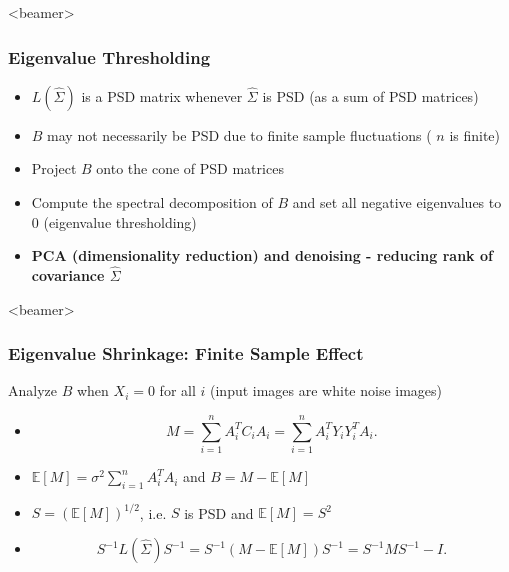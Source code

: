 \documentclass{beamer}
\begin{document}
\begin{frame}<beamer>
\frametitle{Eigenvalue Thresholding}
\begin{itemize}
 \item  $L(\hat{\Sigma})$ is a PSD matrix whenever $\hat{\Sigma}$ is PSD (as 
a sum of PSD matrices)
\item  $B$ may not necessarily be PSD due to finite 
sample fluctuations ( $n$ is finite)
\item  Project 
$B$ onto the cone of PSD matrices
\item  Compute the spectral 
decomposition of $B$ and set all negative eigenvalues to 0  (eigenvalue thresholding)
\item \textbf{PCA (dimensionality reduction) and denoising - reducing rank of covariance $\hat{\Sigma}$}
\end{itemize}
\end{frame}

\begin{frame}<beamer>
\frametitle{Eigenvalue Shrinkage: Finite Sample Effect}
Analyze $B$ when $X_i=0$ for all $i$ (input images 
are white noise images)


\begin{itemize}
 \item  \begin{equation}
M = \sum_{i=1}^n A_i^T C_i A_i = \sum_{i=1}^n A_i^T Y_i Y_i^T A_i.
\end{equation}
\item  $\mathbb{E}[M] = \sigma^2 \sum_{i=1}^n A_i^T A_i$
and $B = M - \mathbb{E}[M]$
\item  $S = (\mathbb{E}[M])^{1/2}$, i.e. 
$S$ is PSD and $\mathbb{E}[M]=S^2$
\item  \begin{equation}
 S^{-1} L(\hat\Sigma)  S^{-1} = S^{-1}(M - \mathbb{E}[M]) S^{-1} = S^{-1} M S^{-1} - I .
\label{eqn:pop1}
\end{equation}
\end{itemize}
\end{frame}
\end{document}
